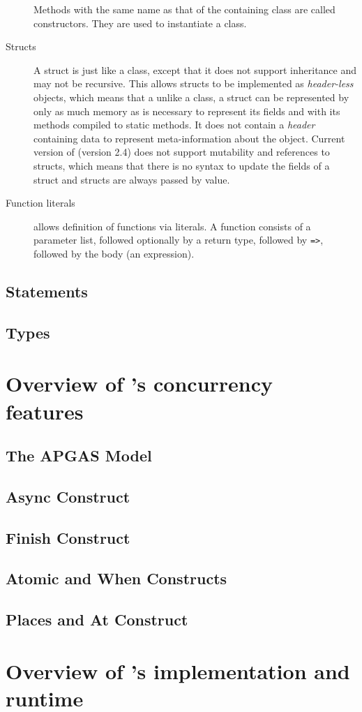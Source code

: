 \begin{description}
Methods with the same name as that of the containing class are called
constructors. They are used to instantiate a class. 

\item[Structs] A struct is just like a class, except that it does not support
inheritance and may not be recursive. This allows structs to be implemented as
\emph{header-less} objects, which means that a unlike a class, a struct can be
represented by only as much memory as is necessary to represent its fields and
with its methods compiled to static methods. It does not contain a \emph{header}
containing data to represent meta-information about the object. Current version
of \xten (version 2.4) does not support mutability and references to structs,
which means that there is no syntax to update the fields of a struct and structs
are always passed by value. 


\item[Function literals] \xten allows definition of functions via literals. A
function consists of a parameter list, followed optionally by a return type,
followed by \texttt{=>}, followed by the body (an expression).
 

 
\end{description}

\subsection{Statements}

\subsection{Types}

\section{Overview of \xten's concurrency features}

\subsection{The APGAS Model}

\subsection{Async Construct}

\subsection{Finish Construct}

\subsection{Atomic and When Constructs}

\subsection{Places and At Construct}

\section{Overview of \xten's implementation and runtime}
 


